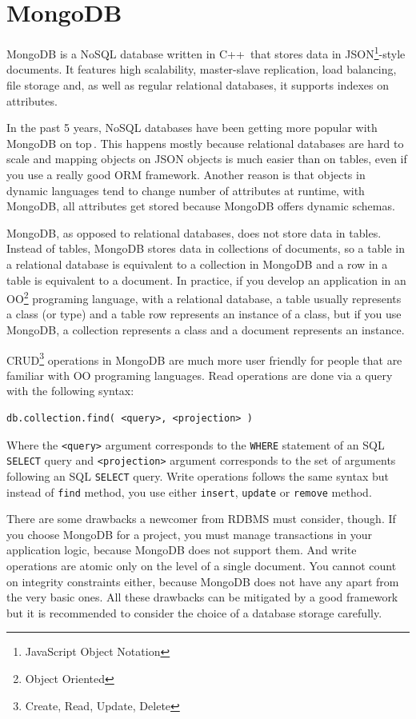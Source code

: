 \section{MongoDB}

MongoDB is a NoSQL database written in C++\,\cite{mongodb-homepage} that stores data in JSON\footnote{JavaScript Object Notation}-style documents. It features high scalability, master-slave replication, load balancing, file storage and, as well as regular relational databases, it supports indexes on attributes. 

In the past 5 years, NoSQL databases have been getting more popular with MongoDB on top\,\cite{db-ranking}. This happens mostly because relational databases are hard to scale and mapping objects on JSON objects is much easier than on tables, even if you use a really good ORM framework. Another reason is that objects in dynamic languages tend to change number of attributes at runtime, with MongoDB, all attributes get stored because MongoDB offers dynamic schemas.

MongoDB, as opposed to relational databases, does not store data in tables. Instead of tables, MongoDB stores data in collections of documents, so a table in a relational database is equivalent to a collection in MongoDB and a row in a table is equivalent to a document. In practice, if you develop an application in an OO\footnote{Object Oriented} programing language, with a relational database, a table usually represents a class (or type) and a table row represents an instance of a class, but if you use MongoDB, a collection represents a class and a document represents an instance.

CRUD\footnote{Create, Read, Update, Delete} operations in MongoDB are much more user friendly for people that are familiar with OO programing languages. Read operations are done via a query with the following syntax:

\begin{verbatim}
db.collection.find( <query>, <projection> )
\end{verbatim}

Where the \texttt{<query>} argument corresponds to the \texttt{WHERE} statement of an SQL \texttt{SELECT} query and \texttt{<projection>} argument corresponds to the set of arguments following an SQL \texttt{SELECT} query. Write operations follows the same syntax but instead of \texttt{find} method, you use either \texttt{insert}, \texttt{update} or \texttt{remove} method.

There are some drawbacks a newcomer from RDBMS must consider, though. If you choose MongoDB for a project, you must manage transactions in your application logic, because MongoDB does not support them. And write operations are atomic only on the level of a single document. You cannot count on integrity constraints either, because MongoDB does not have any apart from the very basic ones. All these drawbacks can be mitigated by a good framework but it is recommended to consider the choice of a database storage carefully.

